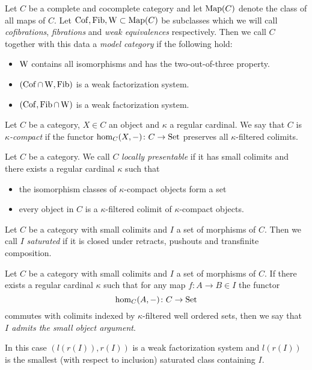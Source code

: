 \begin{definition}
    Let $C$ be a complete and cocomplete category and let $\operatorname{Map}(C)$ denote the class of all maps of $C$.
    Let $\operatorname{Cof},\operatorname{Fib},\operatorname{W}\subset\operatorname{Map}(C)$ be subclasses which we will call \emph{cofibrations}, \emph{fibrations} and \emph{weak equivalences} respectively.
    Then we call $C$ together with this data a \emph{model category} if the following hold:
    \begin{itemize}
        \item $\operatorname{W}$ contains all isomorphisms and has the two-out-of-three property.
        \item $(\operatorname{Cof}\cap\operatorname{W},\operatorname{Fib})$ is a weak factorization system.
        \item $(\operatorname{Cof},\operatorname{Fib}\cap\operatorname{W})$ is a weak factorization system.
    \end{itemize}
\end{definition}
\begin{definition}
    Let $C$ be a category, $X\in C$ an object and $\kappa$ a regular cardinal.
    We say that $C$ is \emph{$\kappa$-compact} if the functor $\hom_C(X,-)\colon C\to\operatorname{Set}$ preserves all $\kappa$-filtered colimits. %
\end{definition}
\begin{definition}[Locally Presentable Category] %
    Let $C$ be a category.
    We call $C$ \emph{locally presentable} if it has small colimits and there exists a regular cardinal $\kappa$ such that
    \begin{itemize}
        \item the isomorphism classes of $\kappa$-compact objects form a set
        \item every object in $C$ is a $\kappa$-filtered colimit of $\kappa$-compact objects.
    \end{itemize}
\end{definition}
\begin{definition}
    Let $C$ be a category with small colimits and $I$ a set of morphisms of $C$.
    Then we call $I$ \emph{saturated} if it is closed under retracts, pushouts and transfinite composition. %
\end{definition}
\begin{thm}
    Let $C$ be a category with small colimits and $I$ a set of morphisms of $C$.
    If there exists a regular cardinal $\kappa$ such that for any map $f\colon A\to B\in I$ the functor
    \begin{equation*}
        \hom_C(A,-)\colon C\to\operatorname{Set}
    \end{equation*}
    commutes with colimits indexed by $\kappa$-filtered well ordered sets, then we say that \emph{$I$ admits the small object argument}.
    
    In this case $(l(r(I)),r(I))$ is a weak factorization system and $l(r(I))$ is the smallest (with respect to inclusion) saturated class containing $I$.
\end{thm}
